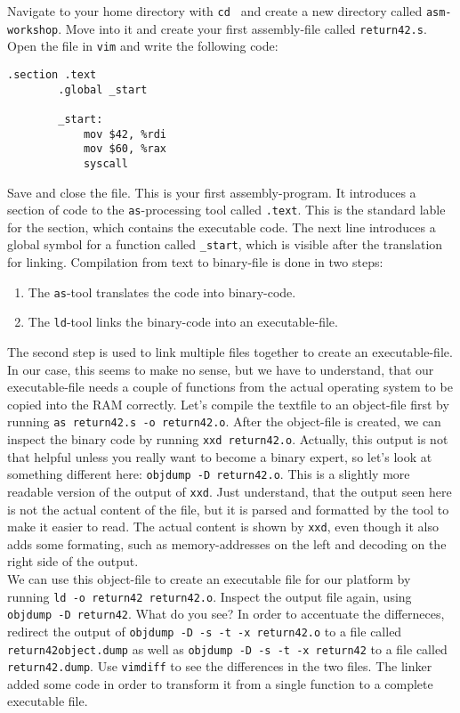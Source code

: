 \documentclass{dcbl/challenge}
\begin{document}
\begin{aufgabe}
    Navigate to your home directory with \texttt{cd } and create a new directory called \texttt{asm-workshop}.
    Move into it and create your first assembly-file called \texttt{return42.s}.
    Open the file in \texttt{vim} and write the following code:
    \begin{lstlisting}[language={[x86masm]Assembler}, caption={Return 42 to the shell}]
        .section .text
        .global _start
        
        _start:
            mov $42, %rdi  
            mov $60, %rax    
            syscall
    \end{lstlisting}
    Save and close the file.
    This is your first assembly-program. 
    It introduces a section of code to the \texttt{as}-processing tool called \texttt{.text}.
    This is the standard lable for the section, which contains the executable code.
    The next line introduces a global symbol for a function called \texttt{\_start}, which is visible after the translation for linking.
    Compilation from text to binary-file is done in two steps:
    \begin{enumerate}
        \item The \texttt{as}-tool translates the code into binary-code.
        \item The \texttt{ld}-tool links the binary-code into an executable-file.
    \end{enumerate}
    The second step is used to link multiple files together to create an executable-file.
    In our case, this seems to make no sense, but we have to understand, that our executable-file needs a couple of functions from the actual operating system to be copied into the RAM correctly. 
    Let's compile the textfile to an object-file first by running \texttt{as return42.s -o return42.o}.
    After the object-file is created, we can inspect the binary code by running \texttt{xxd return42.o}.
    Actually, this output is not that helpful unless you really want to become a binary expert, so let's look at something different here: \texttt{objdump -D return42.o}.
    This is a slightly more readable version of the output of \texttt{xxd}.
    Just understand, that the output seen here is not the actual content of the file, but it is parsed and formatted by the tool to make it easier to read.
    The actual content is shown by \texttt{xxd}, even though it also adds some formating, such as memory-addresses on the left and decoding on the right side of the output.\\
    We can use this object-file to create an executable file for our platform by running \texttt{ld -o return42 return42.o}.
    Inspect the output file again, using \texttt{objdump -D return42}.
    What do you see? 
    In order to accentuate the differneces, redirect the output of \texttt{objdump -D -s -t -x return42.o} to a file called \texttt{return42object.dump} as well as \texttt{objdump -D -s -t -x return42} to a file called \texttt{return42.dump}.
    Use \texttt{vimdiff} to see the differences in the two files.
    The linker added some code in order to transform it from a single function to a complete executable file.\\
\end{aufgabe}
\end{document}

